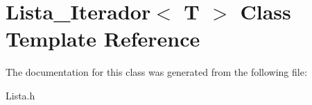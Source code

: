 \hypertarget{class_lista___iterador}{\section{Lista\-\_\-\-Iterador$<$ T $>$ Class Template Reference}
\label{class_lista___iterador}
}


The documentation for this class was generated from the following file\-:\begin{DoxyCompactItemize}
\item 
Lista.\-h\end{DoxyCompactItemize}
